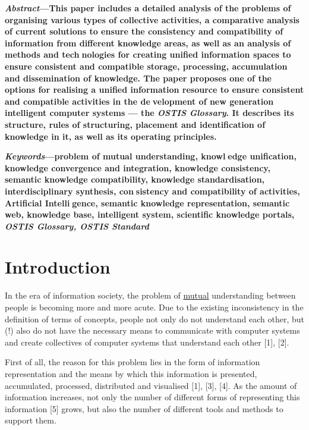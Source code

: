 \documentclass[10pt, a4paper]{article}
\begin{document}
\begin{multicols}{2}

    \textbf{\textit{Abstract}—This paper includes a detailed analysis of the
problems of organising various types of collective activities,
a comparative analysis of current solutions to ensure the
consistency and compatibility of information from different
knowledge areas, as well as an analysis of methods and technologies for creating unified information spaces to ensure
consistent and compatible storage, processing, accumulation
and dissemination of knowledge. The paper proposes one
of the options for realising a unified information resource
to ensure consistent and compatible activities in the development of new generation intelligent computer systems
— the \textit{OSTIS Glossary}. It describes its structure, rules of
structuring, placement and identification of knowledge in
it, as well as its operating principles.} \par
\textbf{\textit{Keywords}—problem of mutual understanding, knowledge unification, knowledge convergence and integration,
knowledge consistency, semantic knowledge compatibility,
knowledge standardisation, interdisciplinary synthesis, consistency and compatibility of activities, Artificial Intelligence, semantic knowledge representation, semantic web,
knowledge base, intelligent system, scientific knowledge
portals,\textit{ OSTIS Glossary, OSTIS Standard}} \par
\setcounter{section}{0}
\section{Introduction}

In the era of information society, the problem of 
\underline{mutual} understanding between people is becoming more
and more acute. Due to the existing inconsistency in
the definition of terms of concepts, people not only
do not understand each other, but (!) also do not have
the necessary means to communicate with computer
systems and create collectives of computer systems that
understand each other [1], [2].

First of all, the reason for this problem lies in the form
of information representation and the means by which
this information is presented, accumulated, processed,
distributed and visualised [1], [3], [4]. As the amount of
information increases, not only the number of different
forms of representing this information [5] grows, but also
the number of different tools and methods to support
them.


\end{multicols}
\end{document}
